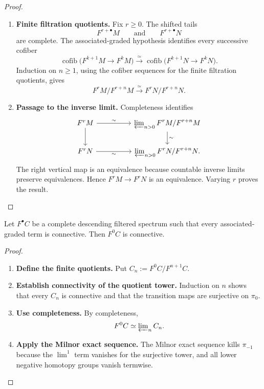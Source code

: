 \begin{proof}
\leavevmode
\begin{enumerate}[label=\textup{(\arabic*)}]
    \item \textbf{Finite filtration quotients.}
    Fix \(r\geq0\). The shifted tails
    \[
        F^{r+\bullet}M
        \qquad\text{and}\qquad
        F^{r+\bullet}N
    \]
    are complete. The associated-graded hypothesis identifies every successive
    cofiber
    \[
        \operatorname{cofib}
        \bigl(F^{k+1}M\to F^kM\bigr)
        \xrightarrow{\simeq}
        \operatorname{cofib}
        \bigl(F^{k+1}N\to F^kN\bigr).
    \]
    Induction on \(n\geq1\), using the cofiber sequences for the finite filtration
    quotients, gives
    \[
        F^rM/F^{r+n}M
        \xrightarrow{\simeq}
        F^rN/F^{r+n}N.
    \]
    \item \textbf{Passage to the inverse limit.}
    Completeness identifies
    \[
    \begin{tikzcd}[column sep=huge]
        F^rM
            \arrow[r,"\sim"]
            \arrow[d]
            &
        \displaystyle\varprojlim\nolimits_{n>0}F^rM/F^{r+n}M
            \arrow[d,"\sim"]
        \\
        F^rN
            \arrow[r,"\sim"']
            &
        \displaystyle\varprojlim\nolimits_{n>0}F^rN/F^{r+n}N .
    \end{tikzcd}
    \]
    The right vertical map is an equivalence because countable inverse limits
    preserve equivalences. Hence \(F^rM\to F^rN\) is an equivalence. Varying
    \(r\) proves the result.
\end{enumerate}
\end{proof}

\begin{lemma}
\label{lem:complete-positive-connectivity}
Let \(F^\bullet C\) be a complete descending filtered spectrum such that every
associated-graded term is connective. Then \(F^0C\) is connective.
\end{lemma}

\begin{proof}
\leavevmode
\begin{enumerate}[label=\textup{(\arabic*)}]
    \item \textbf{Define the finite quotients.}
    Put \(C_n:=F^0C/F^{n+1}C\).
    \item \textbf{Establish connectivity of the quotient tower.}
    Induction on \(n\) shows that every \(C_n\) is
    connective and that the transition maps are surjective on \(\pi_0\).
    \item \textbf{Use completeness.}
    By
    completeness,
    \[
        F^0C\simeq\varprojlim\nolimits_nC_n.
    \]
    \item \textbf{Apply the Milnor exact sequence.}
    The Milnor exact sequence kills \(\pi_{-1}\) because the \(\lim^1\) term
    vanishes for the surjective tower, and all lower negative homotopy groups
    vanish termwise.
\end{enumerate}
\end{proof}



